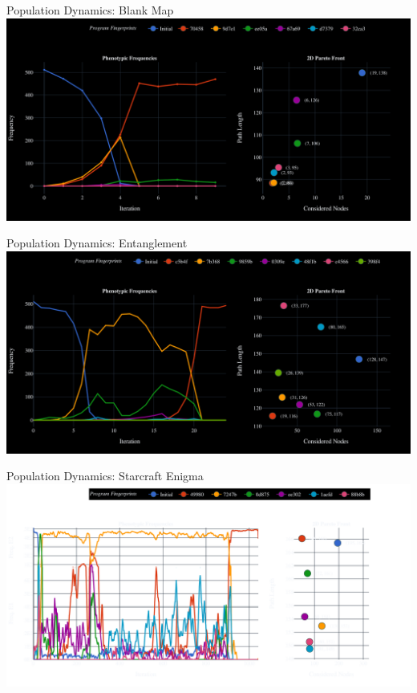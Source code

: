 \documentclass[aspectratio=169]{beamer}
\begin{document}
\begin{frame}{Population Dynamics: Blank Map}
    \includegraphics[width=1.0\linewidth, keepaspectratio]{figures/blank_pheno.pdf}
\end{frame}

\begin{frame}{Population Dynamics: Entanglement}
    \includegraphics[width=1.0\linewidth, keepaspectratio]{figures/tangle_pheno.pdf}
\end{frame}

\begin{frame}{Population Dynamics: Starcraft Enigma}
    \includegraphics[width=1.0\linewidth, keepaspectratio]{figures/pheno.pdf}
\end{frame}
\end{document}
